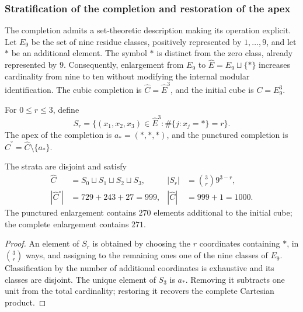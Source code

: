 \subsubsection{Stratification of the completion and restoration of the apex}
\label{x_reciprocidad:sec:revision-emrh}

The completion admits a set-theoretic description making its
operation explicit. Let \(E_9\) be the set of nine residue classes, positively
represented by \(1,\ldots,9\), and let \(\ast\) be an additional element.
The symbol \(\ast\) is distinct from the zero class, already represented by \(9\).
Consequently, enlargement from \(E_9\) to
\(\widehat E=E_9\sqcup\{\ast\}\) increases cardinality from nine to ten
without modifying the internal modular identification. The cubic completion is
\(\widehat C=\widehat E^3\), and the initial cube is \(C=E_9^3\).

\begin{definition}
For \(0\leq r\leq3\), define
\[
 S_r=\{(x_1,x_2,x_3)\in\widehat E^3:
             \#\{j:x_j=\ast\}=r\}.
\]
The apex of the completion is \(a_\ast=(\ast,\ast,\ast)\), and the
punctured completion is \(\widehat C^{\circ}=\widehat C\setminus\{a_\ast\}\).
\end{definition}

\begin{proposition}
The strata are disjoint and satisfy
\begin{align}
 \widehat C&=S_0\sqcup S_1\sqcup S_2\sqcup S_3,
 &|S_r|&=\binom3r9^{3-r},\label{x_reciprocidad:eq:revision-estratos}\\
 |\widehat C^{\circ}|&=729+243+27=999,
 &|\widehat C|&=999+1=1000.\label{x_reciprocidad:eq:revision-999}
\end{align}
The punctured enlargement contains \(270\) elements additional to the initial
cube; the complete enlargement contains \(271\).
\end{proposition}
\begin{proof}
An element of \(S_r\) is obtained by choosing the \(r\) coordinates
containing \(\ast\), in \(\binom3r\) ways, and assigning to the remaining ones
one of the nine classes of \(E_9\). Classification by the number of
additional coordinates is exhaustive and its classes are disjoint. The unique
element of \(S_3\) is \(a_\ast\). Removing it subtracts one unit from the total
cardinality; restoring it recovers the complete Cartesian product.
\end{proof}

